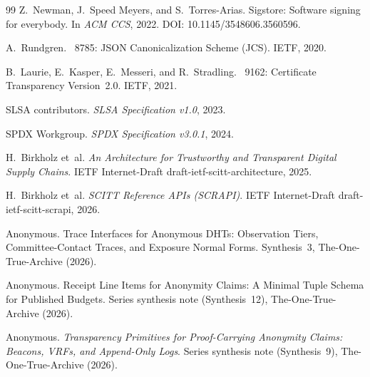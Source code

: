 \documentclass[11pt]{article}
\begin{document}
\begin{thebibliography}{99}
Z.~Newman, J.~Speed Meyers, and S.~Torres-Arias.
\newblock Sigstore: Software signing for everybody.
\newblock In \emph{ACM CCS}, 2022. DOI: 10.1145/3548606.3560596.

A.~Rundgren.
~8785: {JSON} Canonicalization Scheme ({JCS}).
\newblock IETF, 2020.

B.~Laurie, E.~Kasper, E.~Messeri, and R.~Stradling.
~9162: Certificate Transparency Version~2.0.
\newblock IETF, 2021.

SLSA contributors.
\newblock \emph{SLSA Specification v1.0}, 2023.

SPDX Workgroup.
\newblock \emph{SPDX Specification v3.0.1}, 2024.

H.~Birkholz et~al.
\newblock \emph{An Architecture for Trustworthy and Transparent Digital Supply Chains}.
\newblock IETF Internet-Draft draft-ietf-scitt-architecture, 2025.

H.~Birkholz et~al.
\newblock \emph{SCITT Reference APIs (SCRAPI)}.
\newblock IETF Internet-Draft draft-ietf-scitt-scrapi, 2026.

Anonymous.
\newblock Trace Interfaces for Anonymous DHTs: Observation Tiers, Committee-Contact Traces, and Exposure Normal Forms.
\newblock Synthesis~3, The-One-True-Archive (2026).

Anonymous.
\newblock Receipt Line Items for Anonymity Claims: A Minimal Tuple Schema for Published Budgets.
\newblock Series synthesis note (Synthesis~12), The-One-True-Archive (2026).

Anonymous.
\newblock \emph{Transparency Primitives for Proof-Carrying Anonymity Claims: Beacons, VRFs, and Append-Only Logs}.
\newblock Series synthesis note (Synthesis~9), The-One-True-Archive (2026).

\end{thebibliography}
\end{document}
